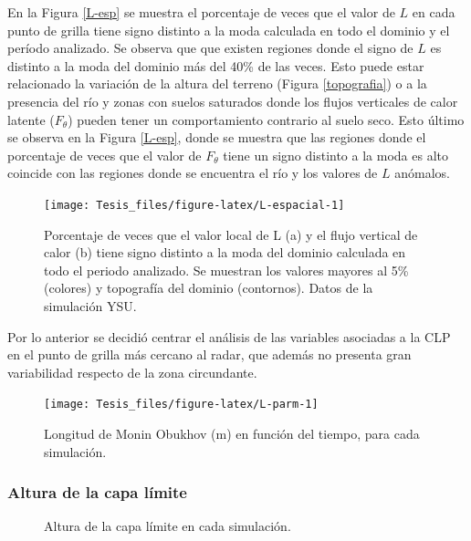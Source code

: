 \documentclass[12pt,spanish,oneside]{book}
\begin{document}
En la Figura \ref{L-esp} se muestra el porcentaje de veces que el valor
de \(L\) en cada punto de grilla tiene signo distinto a la moda
calculada en todo el dominio y el período analizado. Se observa que que
existen regiones donde el signo de \(L\) es distinto a la moda del
dominio más del 40\% de las veces. Esto puede estar relacionado la
variación de la altura del terreno (Figura \ref{topografia}) o a la
presencia del río y zonas con suelos saturados donde los flujos
verticales de calor latente (\(F_{\theta}\)) pueden tener un
comportamiento contrario al suelo seco. Esto último se observa en la
Figura \ref{L-esp}, donde se muestra que las regiones donde el
porcentaje de veces que el valor de \(F_{\theta}\) tiene un signo
distinto a la moda es alto coincide con las regiones donde se encuentra
el río y los valores de \(L\) anómalos.

\begin{figure}

{\centering \texttt{[image: Tesis\_files/figure-latex/L-espacial-1]} 

}

\caption{Porcentaje de veces que el valor local de L (a) y el flujo vertical de calor (b) tiene signo distinto a la moda del dominio calculada en todo el periodo analizado. Se muestran los valores mayores al 5\% (colores) y topografía del dominio (contornos). Datos de la simulación YSU. \label{L-esp}}\label{fig:L-espacial}
\end{figure}

Por lo anterior se decidió centrar el análisis de las variables
asociadas a la CLP en el punto de grilla más cercano al radar, que
además no presenta gran variabilidad respecto de la zona circundante.

\begin{figure}

{\centering \texttt{[image: Tesis\_files/figure-latex/L-parm-1]} 

}

\caption{Longitud de Monin Obukhov (m) en función del tiempo, para cada simulación. \label{L-param}}\label{fig:L-parm}
\end{figure}

\subsubsection{Altura de la capa
límite}\label{altura-de-la-capa-limite-1}

\begin{figure}

{\centering {}\newline{}

}

\caption{Altura de la capa límite en cada simulación. \label{pblh-wrf}}\label{fig:pblh-wrf}
\end{figure}
\end{document}
